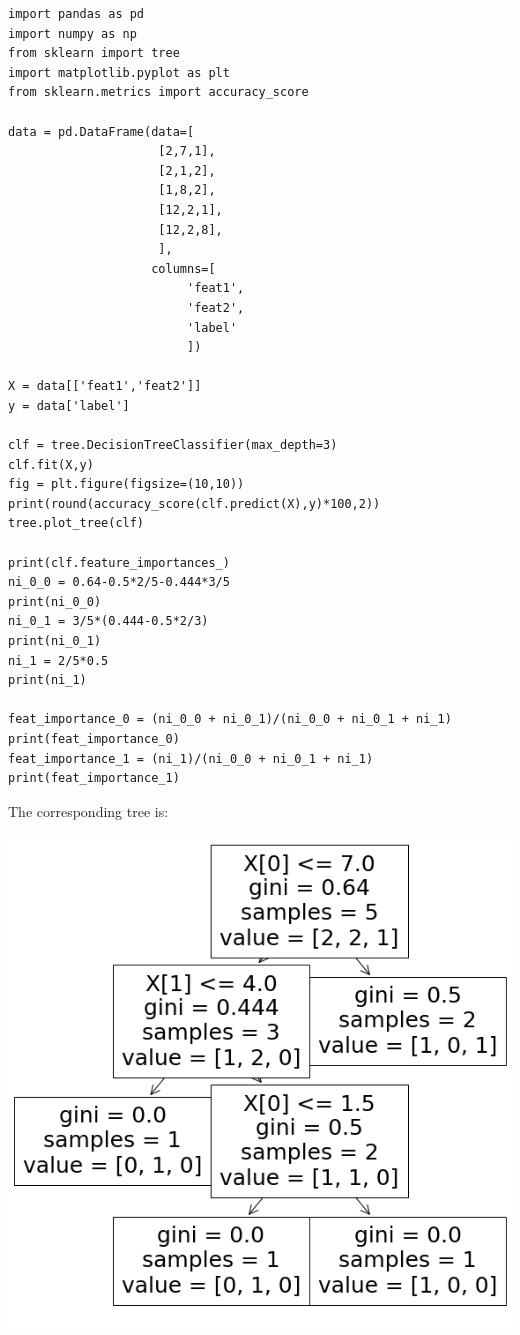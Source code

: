 \lstset{language=Python}
\lstset{frame=lines}
\lstset{basicstyle=\footnotesize}
\begin{lstlisting}
import pandas as pd
import numpy as np
from sklearn import tree
import matplotlib.pyplot as plt
from sklearn.metrics import accuracy_score

data = pd.DataFrame(data=[
                     [2,7,1],
                     [2,1,2],
                     [1,8,2],
                     [12,2,1],
                     [12,2,8],
                     ],
                    columns=[
                         'feat1',
                         'feat2',
                         'label'
                         ])

X = data[['feat1','feat2']]
y = data['label']

clf = tree.DecisionTreeClassifier(max_depth=3)
clf.fit(X,y)
fig = plt.figure(figsize=(10,10))
print(round(accuracy_score(clf.predict(X),y)*100,2))
tree.plot_tree(clf)

print(clf.feature_importances_)
ni_0_0 = 0.64-0.5*2/5-0.444*3/5
print(ni_0_0)
ni_0_1 = 3/5*(0.444-0.5*2/3)
print(ni_0_1)
ni_1 = 2/5*0.5
print(ni_1)

feat_importance_0 = (ni_0_0 + ni_0_1)/(ni_0_0 + ni_0_1 + ni_1)
print(feat_importance_0)
feat_importance_1 = (ni_1)/(ni_0_0 + ni_0_1 + ni_1)
print(feat_importance_1)
\end{lstlisting}

The corresponding tree is:

\begin{center}
\includegraphics[scale=0.4]{tree_feat_importance.png}
\end{center}

\vspace{5mm}
